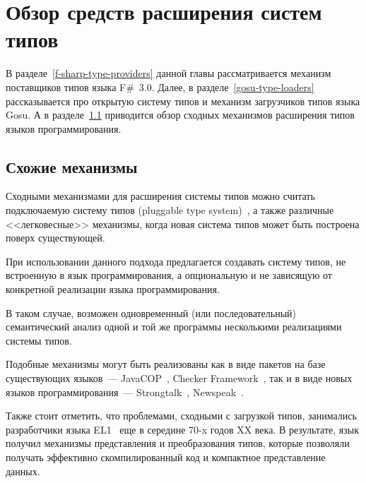 \section{Обзор средств расширения систем типов}
В разделе~\ref{f-sharp-type-providers} данной главы рассматривается механизм поставщиков типов языка F\#~3.0. Далее, в разделе~\ref{gosu-type-loaders} рассказывается про открытую систему типов и механизм загрузчиков типов языка Gosu. А в разделе~\ref{similar-mechanisms} приводится обзор сходных механизмов расширения типов языков программирования.




\subsection{Схожие механизмы}\label{similar-mechanisms}
Сходными механизмами для расширения системы типов можно считать подключаемую систему типов (pluggable type system)~\cite{bracha}, а также различные <<легковесные>> механизмы, когда новая система типов может быть построена поверх существующей.

При использовании данного подхода предлагается создавать систему типов, не встроенную в язык программирования, а опциональную и не зависящую от конкретной реализации языка программирования.

В таком случае, возможен одновременный (или последовательный) семантический анализ одной и той же программы несколькими реализациями системы типов.

Подобные механизмы могут быть реализованы как в виде пакетов на базе существующих языков~--- JavaCOP~\cite{javacop2010}, Checker Framework~\cite{checkerframework2008},
так и в виде новых языков программирования~--- Strongtalk~\cite{strongtalk1993}, Newspeak~\cite{newspeak2008}.

Также стоит отметить, что проблемами, сходными с загрузкой типов, занимались разработчики языка EL1~\cite{el1} еще в середине 70-x годов XX века.
В результате, язык получил механизмы представления и преобразования типов, которые позволяли получать эффективно скомпилированный код и компактное представление данных.